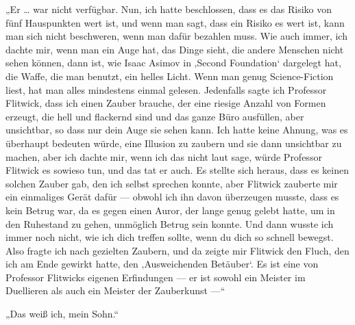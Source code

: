 „Er … war nicht verfügbar. Nun, ich hatte beschlossen, dass es das Risiko von fünf Hauspunkten wert ist, und wenn man sagt, dass ein Risiko es wert ist, kann man sich nicht beschweren, wenn man dafür bezahlen muss. Wie auch immer, ich dachte mir, wenn man ein Auge hat, das Dinge sieht, die andere Menschen nicht sehen können, dann ist, wie Isaac Asimov in ‚Second Foundation‘ dargelegt hat, die Waffe, die man benutzt, ein helles Licht. Wenn man genug Science-Fiction liest, hat man alles mindestens einmal gelesen. Jedenfalls sagte ich Professor Flitwick, dass ich einen Zauber brauche, der eine riesige Anzahl von Formen erzeugt, die hell und flackernd sind und das ganze Büro ausfüllen, aber unsichtbar, so dass nur dein Auge sie sehen kann. Ich hatte keine Ahnung, was es überhaupt bedeuten würde, eine Illusion zu zaubern und sie dann unsichtbar zu machen, aber ich dachte mir, wenn ich das nicht laut sage, würde Professor Flitwick es sowieso tun, und das tat er auch. Es stellte sich heraus, dass es keinen solchen Zauber gab, den ich selbst sprechen konnte, aber Flitwick zauberte mir ein einmaliges Gerät dafür — obwohl ich ihn davon überzeugen musste, dass es kein Betrug war, da es gegen einen Auror, der lange genug gelebt hatte, um in den Ruhestand zu gehen, unmöglich Betrug sein konnte. Und dann wusste ich immer noch nicht, wie ich dich treffen sollte, wenn du dich so schnell bewegst. Also fragte ich nach gezielten Zaubern, und da zeigte mir Flitwick den Fluch, den ich am Ende gewirkt hatte, den ‚Ausweichenden Betäuber‘. Es ist eine von Professor Flitwicks eigenen Erfindungen — er ist sowohl ein Meister im Duellieren als auch ein Meister der Zauberkunst —“

„Das weiß ich, mein Sohn.“

